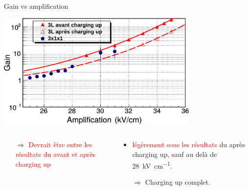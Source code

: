     \begin{frame}{Gain vs amplification}
        \begin{scriptsize}
            \centering \includegraphics[width=0.75\textwidth]{./pictures/gain_vs_ampli.pdf} \\
            \begin{columns}
                \begin{column}{0.5\textwidth} 
                    \begin{itemize}
                        \item[$\Rightarrow$]  \textcolor{red}{Devrait être entre les résultats du \threeL{} avant et après charging up}
                    \end{itemize}
                \end{column}
                \begin{column}{0.5\textwidth}
                    \begin{itemize}
                        \item \TOO{} \textcolor{red}{légèrement sous les résultats} du \threeL{} après charging up, sauf au delà de \SI{28}{\kilo\volt\per\centi\meter}.
                        \item[$\Rightarrow$] Charging up complet.
                    \end{itemize}
                \end{column}
            \end{columns}
        \end{scriptsize}
    \end{frame}
    
